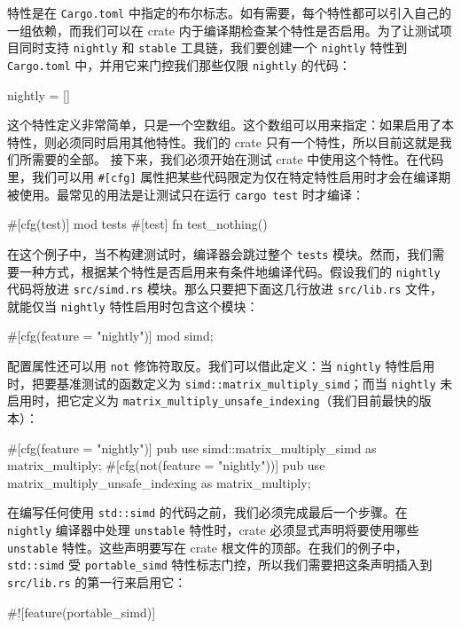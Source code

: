 特性是在 \texttt{Cargo.toml} 中指定的布尔标志。如有需要，每个特性都可以引入自己的一组依赖，而我们可以在 crate 内于编译期检查某个特性是否启用。为了让测试项目同时支持 \texttt{nightly} 和 \texttt{stable} 工具链，我们要创建一个
\texttt{nightly} 特性到 \texttt{Cargo.toml} 中，并用它来门控我们那些仅限 \texttt{nightly} 的代码：
\begin{codeboxdark}
[features]
nightly = []
\end{codeboxdark}
这个特性定义非常简单，只是一个空数组。这个数组可以用来指定：如果启用了本特性，则必须同时启用其他特性。我们的 crate 只有一个特性，所以目前这就是我们所需要的全部。
\label{idx:idx_f63d6564}
接下来，我们必须开始在测试 crate 中使用这个特性。在代码里，我们可以用 \texttt{\#[cfg]} 属性把某些代码限定为仅在特定特性启用时才会在编译期被使用。最常见的用法是让测试只在运行 \texttt{cargo test} 时才编译：
\begin{codebox}[rust]
#[cfg(test)]
mod tests {
    #[test]
    fn test_nothing() {}
}
\end{codebox}
在这个例子中，当不构建测试时，编译器会跳过整个 \texttt{tests} 模块。然而，我们需要一种方式，根据某个特性是否启用来有条件地编译代码。假设我们的 \texttt{nightly} 代码将放进 \texttt{src/simd.rs} 模块。那么只要把下面这几行放进 \texttt{src/lib.rs} 文件，就能仅当 \texttt{nightly} 特性启用时包含这个模块：
\begin{codebox}[rust]
#[cfg(feature = "nightly")]
mod simd;
\end{codebox}
配置属性还可以用 \texttt{not} 修饰符取反。我们可以借此定义：当 \texttt{nightly} 特性启用时，把要基准测试的函数定义为 \texttt{simd::\allowbreak{}matrix\_\allowbreak{}multiply\_\allowbreak{}simd}；而当 \texttt{nightly} 未启用时，把它定义为 \texttt{matrix\_\allowbreak{}multiply\_\allowbreak{}unsafe\_\allowbreak{}indexing}（我们目前最快的版本）：
\begin{codebox}[rust]
#[cfg(feature = "nightly")]
pub use simd::matrix_multiply_simd as matrix_multiply;
#[cfg(not(feature = "nightly"))]
pub use matrix_multiply_unsafe_indexing as matrix_multiply;
\end{codebox}
在编写任何使用 \texttt{std::simd} 的代码之前，我们必须完成最后一个步骤。在 \texttt{nightly} 编译器中处理 \texttt{unstable} 特性时，crate 必须显式声明将要使用哪些
\texttt{unstable} 特性。这些声明要写在 crate 根文件的顶部。在我们的例子中，\texttt{std::simd} 受
\label{idx:idx_16593081}
\texttt{portable\_\allowbreak{}simd} 特性标志门控，所以我们需要把这条声明插入到
\texttt{src/lib.rs} 的第一行来启用它：
\begin{codebox}[text]
#![feature(portable_simd)]
\end{codebox}

